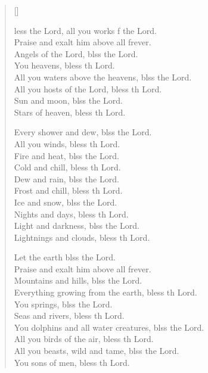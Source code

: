 \settowidth{\versewidth}{Let us bless the Father, and the Son, and the Holy Spirit. *}
\begin{verse}[\versewidth]
  \begin{patverse}
    less the Lord, all you works f the Lord.\Med\\
Praise and exalt him above all frever.\\
Angels of the Lord, blss the Lord.\Med\\
You heavens, bless th Lord.\\
All you waters above the heavens, blss the Lord.\Med\\
All you hosts of the Lord, bless th Lord.\\
Sun and moon, blss the Lord.\Med\\
Stars of heaven, bless th Lord.

Every shower and dew, blss the Lord.\Med\\
All you winds, bless th Lord.\\
Fire and heat, blss the Lord.\Med\\
Cold and chill, bless th Lord.\\
Dew and rain, blss the Lord.\Med\\
Frost and chill, bless th Lord.\\
Ice and snow, blss the Lord.\Med\\
Nights and days, bless th Lord.\\
Light and darkness, blss the Lord.\Med\\
Lightnings and clouds, bless th Lord.

Let the earth blss the Lord.\Med\\
Praise and exalt him above all frever.\\
Mountains and hills, blss the Lord.\Med\\
Everything growing from the earth, bless th Lord.\\
You springs, blss the Lord.\Med\\
Seas and rivers, bless th Lord.\\
You dolphins and all water creatures, blss the Lord.\Med\\
All you birds of the air, bless th Lord.\\
All you beasts, wild and tame, blss the Lord.\Med\\
You sons of men, bless th Lord.


\end{patverse}
\end{verse}
